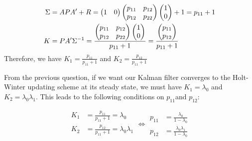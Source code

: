 \begin{equation} \label{eq:Kconditions}
\begin{split}
\Sigma &= APA' + R = \begin{pmatrix}1 & 0\end{pmatrix} \begin{pmatrix}p_{11} & p_{12}\\p_{12} & p_{22}\end{pmatrix}  \colvec{1}{0} + 1 = p_{11} + 1 \\
K &= PA'\Sigma^{-1} = \frac{\begin{pmatrix}p_{11} & p_{12}\\p_{12} & p_{22}\end{pmatrix} \colvec{1}{0}}{p_{11}+1} = \frac{\colvec{p_{11}}{p_{12}}}{p_{11}+1}
\end{split}
\end{equation}
Therefore, we have $K_1 = \frac{p_{11}}{p_{11}+1}$ and $K_2 = \frac{p_{12}}{p_{11}+1}$

From the previous question, if we want our Kalman filter converges to the Holt-Winter updating scheme at its steady state, we must have $K_1 = \lambda_0$ and $K_2 = \lambda_0\lambda_1$. This leads to the following conditions on $p_{11}$and $p_{12}$:

\begin{equation}\label{eq:Pconditions}
\begin{split}
K_1 &= \frac{p_{11}}{p_{11}+1} = \lambda_0 \\
K_2 &= \frac{p_{12}}{p_{11}+1} = \lambda_0 \lambda_1 \\
\end{split}
\Leftrightarrow 
\begin{split}
p_{11} &= \frac{\lambda_0}{1-\lambda_0} \\
p_{12} &= \frac{\lambda_0\lambda_1}{1-\lambda_0}
\end{split}
\end{equation}

